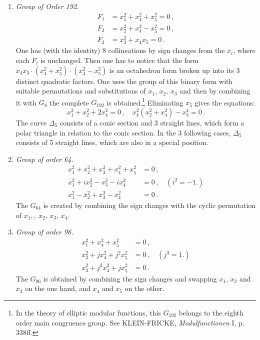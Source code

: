 \documentclass[leqno]{article}
\begin{document}
\begin{enumerate}[label=\arabic*)]
	\item \textit{Group of Order 192}.
	\begin{align*}
		F_1 &= x_1^2 + x_4^2 + x_5^2 = 0 \, , \\
		F_2 &= x_2^2 + x_4^2 - x_5^2 = 0 \, , \\
		F_3 &= x_3^2 + x_4 x_5 = 0 \, . 
	\end{align*}
    One has (with the identity) 8 collineations by sign changes from the $x_i$, where each $F_i$ is unchanged. Then one has to notice that the form $x_4 x_3 \cdot (x_4^2 + x_5^2) \cdot (x_4^2 - x_5^2)$ is an octahedron form broken up into its 3 distinct quadratic factors. One uses the group of this binary form with suitable permutations and substitutions of $x_1, \, x_2, \, x_3$ and then by combining it with $G_8$ the complete $G_{192}$ is obtained.\footnote{In the theory of elliptic modular functions, this $G_{192}$ belongs to the eighth order main congruence group. See KLEIN-FRICKE, \textit{Modulfunctionen} I, p. 338ff.} Eliminating $x_5$ gives the equations:
    \[
    x_1^2 + x_2^2 + 2x_4^2 = 0 \, , \quad x_4^2(x_2^2 + x_4^2) - x_3^4 = 0 \, . 
    \]
    The curve $\Delta_5$ consists of a conic section and 3 straight lines, which form a polar triangle in relation to the conic section. In the 3 following cases, $\Delta_5$ consists of 5 straight lines, which are also in a special position.
    \item \textit{Group of order 64.}
    \begin{align*}
    	x_1^2 + x_2^2 + x_3^2 + x_4^2 + x_5^2 &= 0 \, , \\
    	x_1^2 + i x_2^2 - x_3^2 - i x_4^2 &= 0 \, , \quad (i^2=-1.) \\
    	x_1^2 - x_2^2 + x_3^3 - x_4^2 &= 0 \, . 
    \end{align*}
    The $G_{64}$ is created by combining the sign changes with the cyclic permutation of $x_1, ,\ x_2, \, x_3, \, x_4.$
    \item \textit{Group of order 96.}
    \begin{align*}
    	x_1^2 + x_4^2 + x_5^2 &= 0 \, , \\
    	x_2^2 + j x_4^2 + j^2 x_5^2 &= 0 \, , \quad (j^3=1.) \\
    	x_3^2 + j^2 x_4^2 + j x_5^2 &= 0 \, . 
    \end{align*}
    The $G_{96}$ is obtained by combining the sign changes and swapping $x_1, \, x_2$ and $x_3$ on the one hand, and $x_4$ and $x_5$ on the other.

\end{enumerate}
\end{document}
